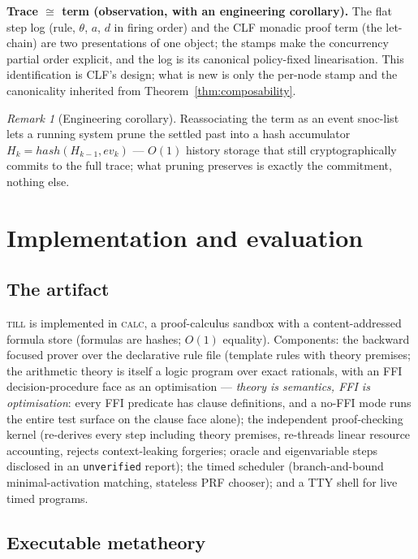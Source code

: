 \documentclass[11pt]{article}
\newcommand{\till}{\textsc{till}}                %
\newcommand{\calc}{\textsc{calc}}               %
\theoremstyle{definition}
\theoremstyle{remark}
\newtheorem{remark}[theorem]{Remark}
\begin{document}
\medskip
\noindent\textbf{Trace $\cong$ term (observation, with an engineering
corollary).}  The flat step log (rule, $\theta$, $a$, $d$ in firing order) and
the CLF monadic proof term (the let-chain) are two presentations of one object;
the stamps make the concurrency partial order explicit, and the log is its
canonical policy-fixed linearisation.  This identification is CLF's design;
what is new is only the per-node stamp and the canonicality inherited from
Theorem~\ref{thm:composability}.

\begin{remark}[Engineering corollary]
Reassociating the term as an event snoc-list lets a running system prune the
settled past into a hash accumulator $H_k = \mathit{hash}(H_{k-1}, \mathit{ev}_k)$
--- $O(1)$ history storage that still cryptographically commits to the full
trace; what pruning preserves is exactly the commitment, nothing else.
\end{remark}

\section{Implementation and evaluation}
\label{sec:impl}

\subsection{The artifact}

\till{} is implemented in \calc{}, a proof-calculus sandbox with a
content-addressed formula store (formulas are hashes; $O(1)$ equality).
Components: the backward focused prover over the declarative rule file (template
rules with theory premises; the arithmetic theory is itself a logic program over
exact rationals, with an FFI decision-procedure face as an optimisation ---
\emph{theory is semantics, FFI is optimisation}: every FFI predicate has clause
definitions, and a no-FFI mode runs the entire test surface on the clause face
alone); the independent proof-checking kernel (re-derives every step including
theory premises, re-threads linear resource accounting, rejects
context-leaking forgeries; oracle and eigenvariable steps disclosed in an
\texttt{unverified} report); the timed scheduler (branch-and-bound
minimal-activation matching, stateless PRF chooser); and a TTY shell for live
timed programs.

\subsection{Executable metatheory}
\end{document}

